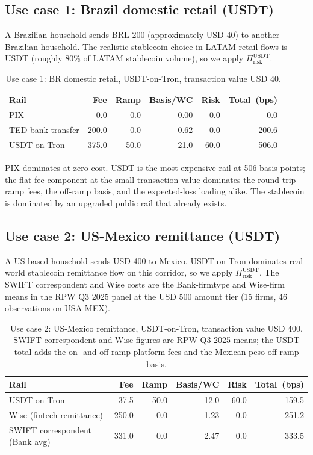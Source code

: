 \subsection{Use case 1: Brazil domestic retail (USDT)}\label{sub:bra_domestic}

A Brazilian household sends BRL 200 (approximately USD 40) to another Brazilian household. The realistic stablecoin choice in LATAM retail flows is USDT (roughly 80\% of LATAM stablecoin volume), so we apply $\Pi_{\text{risk}}^{\text{USDT}}$.

\begin{table}[H]
\centering
\caption{Use case 1: BR domestic retail, USDT-on-Tron, transaction value USD 40.}\label{tab:uc1}
\begin{tabular}{lrrrrr}
\toprule
Rail & Fee & Ramp & Basis/WC & Risk & Total~(bps) \\
\midrule
PIX                  & 0.0    & 0.0  & 0.00  & 0.0  & 0.0   \\
TED bank transfer    & 200.0  & 0.0  & 0.62  & 0.0  & 200.6 \\
USDT on Tron         & 375.0  & 50.0 & 21.0  & 60.0 & 506.0 \\
\bottomrule
\end{tabular}
\end{table}

PIX dominates at zero cost. USDT is the most expensive rail at 506 basis points; the flat-fee component at the small transaction value dominates the round-trip ramp fees, the off-ramp basis, and the expected-loss loading alike. The stablecoin is dominated by an upgraded public rail that already exists.

\subsection{Use case 2: US-Mexico remittance (USDT)}\label{sub:us_mx}

A US-based household sends USD 400 to Mexico. USDT on Tron dominates real-world stablecoin remittance flow on this corridor, so we apply $\Pi_{\text{risk}}^{\text{USDT}}$. The SWIFT correspondent and Wise costs are the Bank-firmtype and Wise-firm means in the RPW Q3 2025 panel at the USD 500 amount tier (15 firms, 46 observations on USA-MEX).

\begin{table}[H]
\centering
\caption{Use case 2: US-Mexico remittance, USDT-on-Tron, transaction value USD 400. SWIFT correspondent and Wise figures are RPW Q3 2025 means; the USDT total adds the on- and off-ramp platform fees and the Mexican peso off-ramp basis.}\label{tab:uc2}
\begin{tabular}{lrrrrr}
\toprule
Rail & Fee & Ramp & Basis/WC & Risk & Total~(bps) \\
\midrule
USDT on Tron                     & 37.5  & 50.0 & 12.0 & 60.0 & 159.5 \\
Wise (fintech remittance)        & 250.0 & 0.0  & 1.23 & 0.0  & 251.2 \\
SWIFT correspondent (Bank avg)   & 331.0 & 0.0  & 2.47 & 0.0  & 333.5 \\
\bottomrule
\end{tabular}
\end{table}

